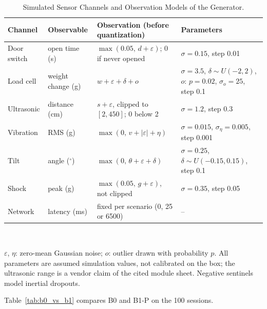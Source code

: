 \documentclass[journal,onecolumn]{IEEEtran}
\begin{document}
\begin{table}[!htbp]
\renewcommand{\arraystretch}{1.02}
\centering
\small
\caption{Simulated Sensor Channels and Observation Models of the Generator.}
\label{tab:sensors}
\vspace{2pt}
\begin{tabular}{l l l l}
\hline
Channel & Observable & Observation (before quantization) & Parameters \\
\hline
\rule{0pt}{2.6ex}Door switch & open time (s) & $\max(0.05,\, d+\varepsilon)$; 0 if never opened & $\sigma=0.15$, step 0.01 \\
Load cell & weight change (g) & $w+\varepsilon+\delta+o$ & $\sigma=3.5$, $\delta\sim U(-2,2)$, $o$: $p=0.02$, $\sigma_o=25$, step 0.1 \\
Ultrasonic & distance (cm) & $s+\varepsilon$, clipped to $[2,450]$; 0 below 2 & $\sigma=1.2$, step 0.3 \\
Vibration & RMS (g) & $\max(0,\, v+|\varepsilon|+\eta)$ & $\sigma=0.015$, $\sigma_\eta=0.005$, step 0.001 \\
Tilt & angle ($^\circ$) & $\max(0,\, \theta+\varepsilon+\delta)$ & $\sigma=0.25$, $\delta\sim U(-0.15,0.15)$, step 0.1 \\
Shock & peak (g) & $\max(0.05,\, g+\varepsilon)$, not clipped & $\sigma=0.35$, step 0.05 \\
Network & latency (ms) & fixed per scenario (0, 25 or 6500) & -- \\
\hline
\end{tabular}
\\[2pt]
\parbox{0.92\linewidth}{\footnotesize $\varepsilon$, $\eta$: zero-mean Gaussian noise; $o$: outlier drawn with
probability $p$. All parameters are assumed simulation values, not calibrated on the box; the ultrasonic range is a
vendor claim of the cited module sheet. Negative sentinels model inertial dropouts.}
\end{table}

Table~\ref{tab:b0_vs_b1} compares B0 and B1-P on the 100 sessions.
\end{document}
